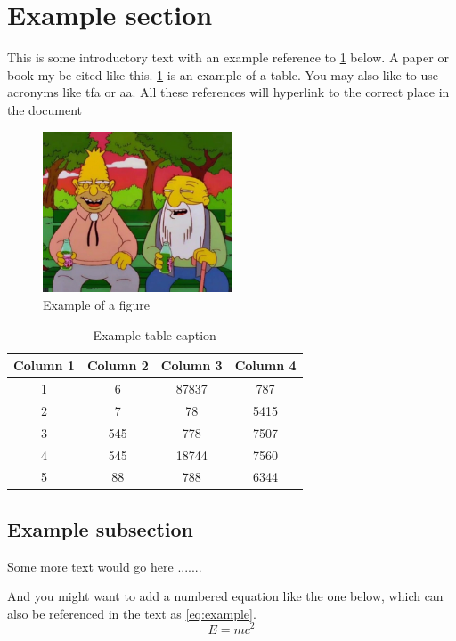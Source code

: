 
\section{Example section}

This is some introductory text with an example reference to \cref{fig:example} below.
A paper \cite{articlecitekey} or book \cite{strunk1999elements} my be cited like this.
\cref{tab:example} is an example of a table.
You may also like to use acronyms like \gls{tfa} or \gls{aa}.
All these references will hyperlink to the correct place in the document

\begin{figure}[h]
\centering
\includegraphics[width=0.5\textwidth]{chapters/chapter_1/figures/example_image.jpg}
\caption{Example of a figure}
\label{fig:example}
\end{figure}

\begin{table}[htb]
\centering
\caption{Example table caption}
\begin{tabular}{c c c c} 
 \hline
 Column 1 & Column 2 & Column 3 & Column 4 \\ 
 \hline\hline
 1 & 6 & 87837 & 787 \\ 
 2 & 7 & 78 & 5415 \\
 3 & 545 & 778 & 7507 \\
 4 & 545 & 18744 & 7560 \\
 5 & 88 & 788 & 6344 \\ 
 \hline
\end{tabular}
\label{tab:example}
\end{table}

\subsection{Example subsection}

Some more text would go here .......
 
And you might want to add a numbered equation like the one below, which can also be referenced in the text as \cref{eq:example}.
\begin{equation} \label{eq:example}
E=mc^2
\end{equation}
